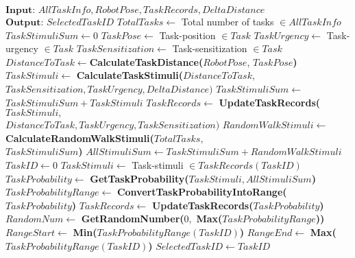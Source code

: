 \begin{algorithmic}[1]
\begin{small}
\label{alg:task-selector}
\State $\textbf{Input: } AllTaskInfo, RobotPose, TaskRecords, DeltaDistance$
\State $\textbf{Output: } SelectedTaskID$
\State {}
\State $TotalTasks \gets$  Total number of tasks $\in AllTaskInfo$  
\State $ TaskStimuliSum \gets 0 $
\State $ TaskPose \gets  $ Task-position  $ \in Task$
\State $ TaskUrgency \gets $ Task-urgency $ \in Task$
\State $ TaskSensitization \gets $ Task-sensitization $\in Task$
\State $ DistanceToTask \gets  $\textbf{CalculateTaskDistance(}$RobotPose$, $TaskPose$\textbf{)}
\State $ TaskStimuli \gets  $ \textbf{CalculateTaskStimuli(}$DistanceToTask,$\\ \hspace*{3.5cm} $TaskSensitization, 	        TaskUrgency, DeltaDistance\textbf{)}$
\State $ TaskStimuliSum \gets$  $TaskStimuliSum + TaskStimuli$
\State $ TaskRecords \gets $ \textbf{UpdateTaskRecords(}$TaskStimuli,$\\ \hspace*{3.5cm}$DistanceToTask, TaskUrgency, TaskSensitization\textbf{)}$
\EndFor
\State $RandomWalkStimuli \gets $ \textbf{CalculateRandomWalkStimuli(}$TotalTasks,$\\ \hspace*{4.5cm} $TaskStimuliSum$\textbf{)}
\State $ AllStimuliSum \gets TaskStimuliSum + RandomWalkStimuli $
\State {}
\State $ TaskID \gets 0 $ 
\State $ TaskStimuli \gets $ Task-stimuli $\in TaskRecords(TaskID)$
\State $ TaskProbability \gets  $ \textbf{GetTaskProbability(}$TaskStimuli, AllStimuliSum$\textbf{)}
\State $ TaskProbabilityRange \gets $ \textbf{ConvertTaskProbabilityIntoRange(}\\ \hspace*{6cm}$TaskProbability$\textbf{)}
\State $ TaskRecords \gets  $ \textbf{UpdateTaskRecords(}$TaskProbability$\textbf{)}
\EndWhile
\State {}
\State $ RandomNum \gets  $ \textbf{GetRandomNumber(}$0,$ \textbf{Max(}$TaskProbabilityRange$\textbf{))}
\State $ RangeStart \gets  $ \textbf{Min(}$TaskProbabilityRange (TaskID)$\textbf{)}
\State $ RangeEnd \gets  $ \textbf{Max(}$TaskProbabilityRange (TaskID)$\textbf{)}
\State $ SelectedTaskID \gets TaskID $ 
\EndIf
\EndWhile
\end{small}
\end{algorithmic}
